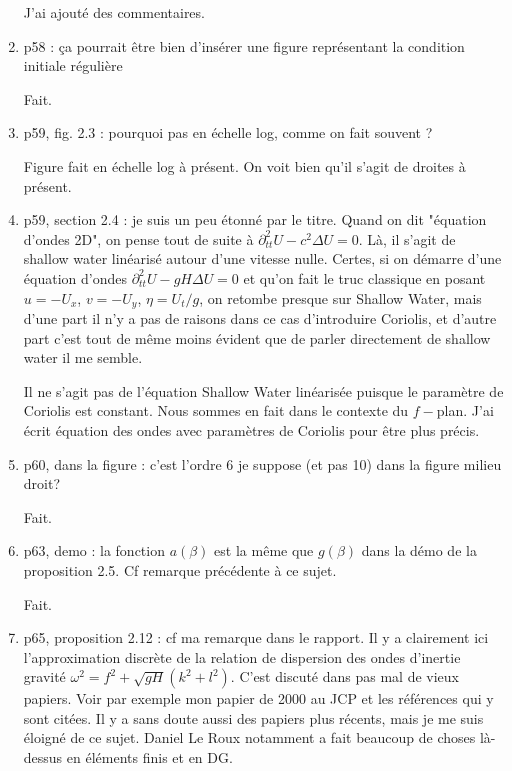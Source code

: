\documentclass[10pt,a4paper]{article}
\begin{document}
\begin{enumerate}
{\color{blue} J'ai ajouté des commentaires.} 


\item p58 : ça pourrait être bien d’insérer une figure représentant la condition initiale
régulière

{\color{blue} Fait.} 


\item p59, fig. 2.3 : pourquoi pas en échelle log, comme on fait souvent ?

{\color{blue} Figure fait en échelle log à présent. On voit bien qu'il s'agit de droites à présent.} 



\item p59, section 2.4 : je suis un peu étonné par le titre. Quand on dit "équation d'ondes 2D", on pense tout de suite à $\partial^2_{tt}U-c^2 \Delta U =0$. Là, il s'agit de shallow water linéarisé autour d'une vitesse nulle. Certes, si on démarre d'une équation d'ondes $\partial^2_{tt}U-gH \Delta U =0$ et qu'on fait le truc classique en posant $u=-U_x$, $v=-U_y$, $\eta = U_t/g$, on retombe presque sur Shallow Water, mais d'une part il n'y a pas de raisons dans ce cas d'introduire Coriolis, et d'autre part c'est tout de même moins évident que de parler directement de shallow water il me semble.

{\color{blue} Il ne s'agit pas de l'équation Shallow Water linéarisée puisque le paramètre de Coriolis est constant. Nous sommes en fait dans le contexte du $f-$plan. J'ai écrit équation des ondes avec paramètres de Coriolis pour être plus précis.} 


\item p60, dans la figure : c'est l'ordre 6 je suppose (et pas 10) dans la figure milieu droit?

{\color{blue} Fait.} 


\item p63, demo : la fonction $a(\beta)$ est la même que $g(\beta)$ dans la démo de la proposition 2.5. Cf remarque précédente à ce sujet.

{\color{blue} Fait.} 

\item p65, proposition 2.12 : cf ma remarque dans le rapport. Il y a clairement ici l'approximation discrète de la relation de dispersion des ondes d’inertie gravité $\omega^2 = f^2 + \sqrt{gH}(k^2+l^2)$. C'est discuté dans pas mal de vieux papiers. Voir par exemple mon papier de 2000 au JCP et les références qui y sont citées. Il y a sans doute aussi des papiers plus récents, mais je me suis éloigné de ce sujet. Daniel Le Roux notamment a fait beaucoup de choses là-dessus en éléments finis et en DG.


\end{enumerate}
\end{document}
